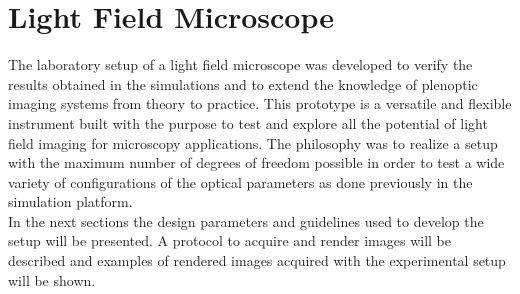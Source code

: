 \chapter{Light Field Microscope}
The laboratory setup of a light field microscope was developed to verify the results obtained in the simulations and to extend the knowledge of plenoptic imaging systems from theory to practice. This prototype is a versatile and flexible instrument built with the purpose to test and explore all the potential of light field imaging for microscopy applications. The philosophy was to realize a setup with the maximum number of degrees of freedom possible in order to test a wide variety of configurations of the optical parameters as done previously in the simulation platform.\\
 In the next sections the design parameters and guidelines used to develop the setup will be presented. A protocol to acquire and render images will be described and examples of rendered images acquired with the experimental setup will be shown. 
